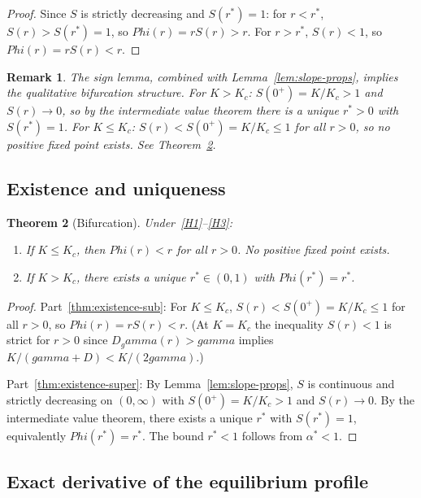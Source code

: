 \documentclass[11pt,a4paper]{article}
\let\Phi\relax\def\Phi{Phi}%
\let\gamma\relax\def\gamma{gamma}%
\newtheorem{theorem}{Theorem}[section]
\newtheorem{remark}[theorem]{Remark}
\theoremstyle{definition}
\begin{document}
\begin{proof}
Since $S$ is strictly decreasing and $S(r^*) = 1$: for $r < r^*$, $S(r) > S(r^*) = 1$, so $\Phi(r) = rS(r) > r$. For $r > r^*$, $S(r) < 1$, so $\Phi(r) = rS(r) < r$.
\end{proof}

\begin{remark}
The sign lemma, combined with Lemma~\ref{lem:slope-props}, implies the qualitative bifurcation structure. For $K > K_c$: $S(0^+) = K/K_c > 1$ and $S(r)\to 0$, so by the intermediate value theorem there is a unique $r^* > 0$ with $S(r^*) = 1$. For $K \leq K_c$: $S(r) < S(0^+) = K/K_c \leq 1$ for all $r > 0$, so no positive fixed point exists. See Theorem~\ref{thm:existence}.
\end{remark}

\subsection{Existence and uniqueness}

\begin{theorem}[Bifurcation]\label{thm:existence}
Under~\ref{H1}--\ref{H3}:
\begin{enumerate}[label=(\alph*),nosep]
\item\label{thm:existence-sub} If $K \leq K_c$, then $\Phi(r) < r$ for all $r > 0$. No positive fixed point exists.
\item\label{thm:existence-super} If $K > K_c$, there exists a unique $r^* \in (0,1)$ with $\Phi(r^*) = r^*$.
\end{enumerate}
\end{theorem}

\begin{proof}
Part~\ref{thm:existence-sub}: For $K \leq K_c$, $S(r) < S(0^+) = K/K_c \leq 1$ for all $r > 0$, so $\Phi(r) = rS(r) < r$. (At $K = K_c$ the inequality $S(r) < 1$ is strict for $r > 0$ since $D_\gamma(r) > \gamma$ implies $K/(\gamma + D) < K/(2\gamma)$.)

Part~\ref{thm:existence-super}: By Lemma~\ref{lem:slope-props}, $S$ is continuous and strictly decreasing on $(0,\infty)$ with $S(0^+) = K/K_c > 1$ and $S(r) \to 0$. By the intermediate value theorem, there exists a unique $r^*$ with $S(r^*) = 1$, equivalently $\Phi(r^*) = r^*$. The bound $r^* < 1$ follows from $\alpha^* < 1$.
\end{proof}

\subsection{Exact derivative of the equilibrium profile}
\end{document}
